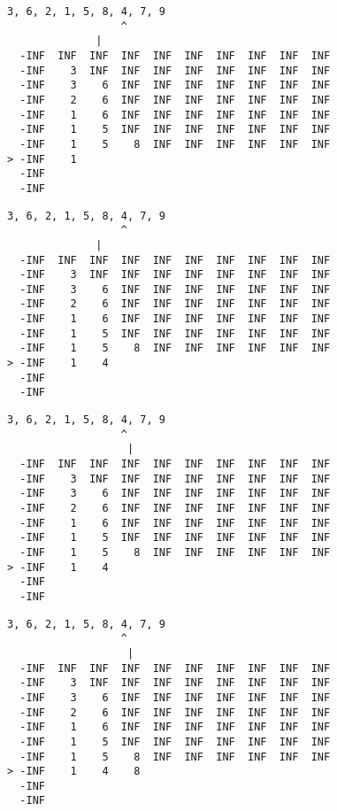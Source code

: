 { \begin{verbatim}
3, 6, 2, 1, 5, 8, 4, 7, 9
                  ^
              |
  -INF  INF  INF  INF  INF  INF  INF  INF  INF  INF
  -INF    3  INF  INF  INF  INF  INF  INF  INF  INF
  -INF    3    6  INF  INF  INF  INF  INF  INF  INF
  -INF    2    6  INF  INF  INF  INF  INF  INF  INF
  -INF    1    6  INF  INF  INF  INF  INF  INF  INF
  -INF    1    5  INF  INF  INF  INF  INF  INF  INF
  -INF    1    5    8  INF  INF  INF  INF  INF  INF
> -INF    1                                        
  -INF                                             
  -INF                                             
\end{verbatim} }

{ \begin{verbatim}
3, 6, 2, 1, 5, 8, 4, 7, 9
                  ^
              |
  -INF  INF  INF  INF  INF  INF  INF  INF  INF  INF
  -INF    3  INF  INF  INF  INF  INF  INF  INF  INF
  -INF    3    6  INF  INF  INF  INF  INF  INF  INF
  -INF    2    6  INF  INF  INF  INF  INF  INF  INF
  -INF    1    6  INF  INF  INF  INF  INF  INF  INF
  -INF    1    5  INF  INF  INF  INF  INF  INF  INF
  -INF    1    5    8  INF  INF  INF  INF  INF  INF
> -INF    1    4                                   
  -INF                                             
  -INF                                             
\end{verbatim} }

{ \begin{verbatim}
3, 6, 2, 1, 5, 8, 4, 7, 9
                  ^
                   |
  -INF  INF  INF  INF  INF  INF  INF  INF  INF  INF
  -INF    3  INF  INF  INF  INF  INF  INF  INF  INF
  -INF    3    6  INF  INF  INF  INF  INF  INF  INF
  -INF    2    6  INF  INF  INF  INF  INF  INF  INF
  -INF    1    6  INF  INF  INF  INF  INF  INF  INF
  -INF    1    5  INF  INF  INF  INF  INF  INF  INF
  -INF    1    5    8  INF  INF  INF  INF  INF  INF
> -INF    1    4                                   
  -INF                                             
  -INF                                             
\end{verbatim} }

{ \begin{verbatim}
3, 6, 2, 1, 5, 8, 4, 7, 9
                  ^
                   |
  -INF  INF  INF  INF  INF  INF  INF  INF  INF  INF
  -INF    3  INF  INF  INF  INF  INF  INF  INF  INF
  -INF    3    6  INF  INF  INF  INF  INF  INF  INF
  -INF    2    6  INF  INF  INF  INF  INF  INF  INF
  -INF    1    6  INF  INF  INF  INF  INF  INF  INF
  -INF    1    5  INF  INF  INF  INF  INF  INF  INF
  -INF    1    5    8  INF  INF  INF  INF  INF  INF
> -INF    1    4    8                              
  -INF                                             
  -INF                                             
\end{verbatim} }


